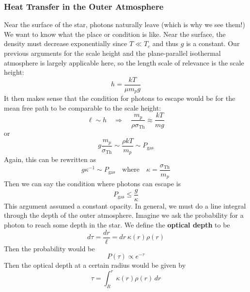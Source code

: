 \documentclass[10pt]{article}
\numberwithin{equation}{section}
\begin{document}
	\subsubsection{Heat Transfer in the Outer Atmosphere}
	Near the surface of the star, photons naturally leave (which is why we see them!) We want to know what the place or condition is like. Near the surface, the density must decrease exponentially since $T\ll T_c$ and thus $g$ is a constant. Our previous arguments for the scale height and the plane-parallel isothermal atmosphere is largely applicable here, so the length scale of relevance is the scale height:
	\begin{equation}
		\label{HTS.42} h=\frac{kT}{\mu m_p g}
	\end{equation}
	It then makes sense that the condition for photons to escape would be for the mean free path to be comparable to the scale height:
	\begin{equation}
		\label{HTS.43} \ell\sim h\quad\Rightarrow\quad \frac{m_p}{\rho\sigma_{\mathrm{Th}}}\approx \frac{kT}{mg}
	\end{equation}
	or
	\begin{equation}
		\label{HTS.44} g\frac{m_p}{\sigma_{\mathrm{Th}}}\sim\frac{\rho kT}{m_p}\sim P_{\mathrm{gas}}
	\end{equation}
	Again, this can be rewritten as
	\begin{equation}
		\label{HTS.45} g\kappa^{-1}\sim P_{\mathrm{gas}}\quad\mathrm{where}\quad \kappa=\frac{\sigma_{\mathrm{Th}}}{m_p}
	\end{equation}
	Then we can say the condition where photons can escape is
	\begin{equation}
		\label{HTS.46} P_{\mathrm{gas}}\leq \frac{g}{\kappa}
	\end{equation}
	This argument assumed a constant opacity. In general, we must
        do a line integral through the depth of the outer
        atmosphere. Imagine we ask the probability for a photon to
        reach some depth in the star. We define the \textbf{optical
          depth} to be
	\begin{equation}
		\label{HTS.47} d\tau = \frac{dr}{\ell}=dr\ \kappa(r)\rho(r)
	\end{equation}
	Then the probability would be
	\begin{equation}
		\label{HTS.48} P(\tau)\propto e^{-\tau}
	\end{equation}
	Then the optical depth at a certain radius would be given by
	\begin{equation}
		\label{HTS.49} \tau = \int_R^r\kappa(r)\rho(r)\,dr
	\end{equation}
\end{document}
